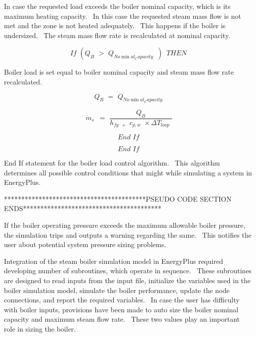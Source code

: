 In case the requested load exceeds the boiler nominal capacity, which is its maximum heating capacity.~ In this case the requested steam mass flow is not met and the zone is not heated adequately.~ This happens if the boiler is undersized.~ The steam mass flow rate is recalculated at nominal capacity.

\begin{equation}
If\,\,({Q_B}\,\, > \,\,{Q_{No\min al_Capacity}}\,\,\,)\,\,\,THEN
\end{equation}

Boiler load is set equal to boiler nominal capacity and steam mass flow rate recalculated.

\begin{equation}
{Q_B}\,\, = \,\,{Q_{No\min al_Capacity}}
\end{equation}

\begin{equation}
\,{\dot m_s}\,\,\, = \,\,\frac{{{Q_B}}}{{{h_{fg\,\,\, + }}\,\,{c_{p,w}}\,\, \times \Delta {T_{loop}}\,\,}}
\end{equation}

\begin{equation}
End\,\,If
\end{equation}

\begin{equation}
End\,\,If
\end{equation}

End If statement for the boiler load control algorithm.~ This algorithm determines all possible control conditions that might while simulating a system in EnergyPlus.

*****************************************PSEUDO CODE SECTION ENDS****************************************

If the boiler operating pressure exceeds the maximum allowable boiler pressure, the simulation trips and outputs a warning regarding the same.~ This notifies the user about potential system pressure sizing problems.

Integration of the steam boiler simulation model in EnergyPlus required developing number of subroutines, which operate in sequence.~ These subroutines are designed to read inputs from the input file, initialize the variables used in the boiler simulation model, simulate the boiler performance, update the node connections, and report the required variables.~ In case the user has difficulty with boiler inputs, provisions have been made to auto size the boiler nominal capacity and maximum steam flow rate.~ These two values play an important role in sizing the boiler.

